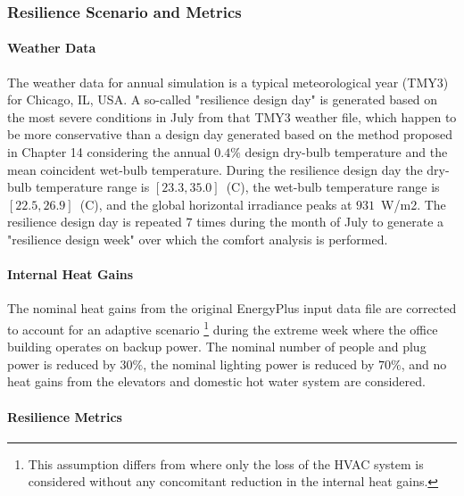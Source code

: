 \subsubsection{Resilience Scenario and Metrics} \label{sec:resilience}

\paragraph{Weather Data} \label{par:weather}

The weather data for annual simulation is a typical meteorological year (TMY3) for Chicago, IL, USA.
A so-called "resilience design day" is generated based on the most severe conditions in July from that TMY3 weather file, which happen to be more conservative than a design day generated based on the method proposed in \cite{ASHRAE2017} Chapter 14 considering the annual $0.4\%$ design dry-bulb temperature and the mean coincident wet-bulb temperature.
During the resilience design day the dry-bulb temperature range is $[23.3, 35.0]$~(C), the wet-bulb temperature range is $[22.5, 26.9]$~(C), and the global horizontal irradiance peaks at $931$~W/m2.
The resilience design day is repeated $7$ times during the month of July to generate a "resilience design week" over which the comfort analysis is performed.

\paragraph{Internal Heat Gains} \label{par:heatgains}

The nominal heat gains from the original EnergyPlus input data file are corrected to account for an adaptive scenario%
\footnote{This assumption differs from \cite{Mathew2021} where only the loss of the HVAC system is considered without any concomitant reduction in the internal heat gains.}
during the extreme week where the office building operates on backup power. The nominal number of people and plug power is reduced by $30\%$, the nominal lighting power is reduced by $70\%$, and no heat gains from the elevators and domestic hot water system are considered.

\paragraph{Resilience Metrics} \label{par:metrics}

